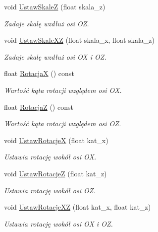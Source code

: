 \begin{DoxyCompactItemize}
void \mbox{\hyperlink{class_pz_g_1_1_lacze_do_g_n_u_plota_ab0486db3166d8db6580a221079af241f}{Ustaw\+SkaleZ}} (float skala\+\_\+z)
\begin{DoxyCompactList}\small\item\em Zadaje skalę wzdłuż osi {\itshape OZ}. \end{DoxyCompactList}\item 
void \mbox{\hyperlink{class_pz_g_1_1_lacze_do_g_n_u_plota_a4308151b54e105d302803146a3238699}{Ustaw\+Skale\+XZ}} (float skala\+\_\+x, float skala\+\_\+z)
\begin{DoxyCompactList}\small\item\em Zadaje skalę wzdłuż osi {\itshape OX} i {\itshape OZ}. \end{DoxyCompactList}\item 
float \mbox{\hyperlink{class_pz_g_1_1_lacze_do_g_n_u_plota_addf0b844f626f3f5220de70efcbbdbb3}{RotacjaX}} () const
\begin{DoxyCompactList}\small\item\em Wartość kąta rotacji względem osi {\itshape OX}. \end{DoxyCompactList}\item 
float \mbox{\hyperlink{class_pz_g_1_1_lacze_do_g_n_u_plota_a9dac73754fab10644b287756003e9c79}{RotacjaZ}} () const
\begin{DoxyCompactList}\small\item\em Wartość kąta rotacji względem osi {\itshape OZ}. \end{DoxyCompactList}\item 
void \mbox{\hyperlink{class_pz_g_1_1_lacze_do_g_n_u_plota_a88324c53a70846fb6bc9d918ce21fd56}{Ustaw\+RotacjeX}} (float kat\+\_\+x)
\begin{DoxyCompactList}\small\item\em Ustawia rotację wokół osi {\itshape OX}. \end{DoxyCompactList}\item 
void \mbox{\hyperlink{class_pz_g_1_1_lacze_do_g_n_u_plota_a458399aa2a8f4b3f00ccd5b272857ea1}{Ustaw\+RotacjeZ}} (float kat\+\_\+z)
\begin{DoxyCompactList}\small\item\em Ustawia rotację wokół osi {\itshape OZ}. \end{DoxyCompactList}\item 
void \mbox{\hyperlink{class_pz_g_1_1_lacze_do_g_n_u_plota_a94d8527fd78048ed6cb32ffb29e5f903}{Ustaw\+Rotacje\+XZ}} (float kat\+\_\+x, float kat\+\_\+z)
\begin{DoxyCompactList}\small\item\em Ustawia rotację wokół osi {\itshape OX} i {\itshape OZ}. \end{DoxyCompactList}\item 

\end{DoxyCompactItemize}
